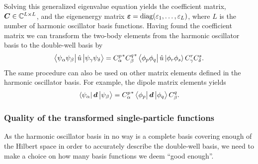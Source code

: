         Solving this generalized eigenvalue equation yields the coefficient
        matrix, $\boldsymbol{C} \in \mathbb{C}^{L\times L}$, and the eigenenergy matrix
        $\boldsymbol{\varepsilon} = \operatorname{diag}(\varepsilon_1, \dots, \varepsilon_L)$, where
        $L$ is the number of harmonic oscillator basis functions.
        Having found the coefficient matrix we can transform the two-body
        elements from the harmonic oscillator basis to the double-well basis by
        \begin{align}
            \bra{\psi_{\alpha} \psi_{\beta}}
            \hat{u}
            \ket{\psi_{\gamma} \psi_{\delta}}
            = {C^{p}_{\alpha}}^{*}
            {C^{q}_{\beta}}^{*}
            \bra{\phi_{p} \phi_{q}}
            \hat{u}
            \ket{\phi_{r} \phi_{s}}
            C^{r}_{\gamma}
            C^{s}_{\delta}.
        \end{align}
        The same procedure can also be used on other matrix elements defined in
        the harmonic oscillator basis. For example, the dipole matrix elements
        yields
        \begin{align}
            \bra{\psi_{\alpha}}
            \boldsymbol{d}
            \ket{\psi_{\beta}}
            = {C^{p}_{\alpha}}^{*}
            \bra{\phi_{p}}
            \boldsymbol{d}
            \ket{\phi_{q}}
            C^{q}_{\beta}.
        \end{align}

        \subsubsection{Quality of the transformed single-particle functions}
            As the harmonic oscillator basis in no way is a complete basis
            covering enough of the Hilbert space in order to accurately describe
            the double-well basis, we need to make a choice on how many basis
            functions we deem ``good enough''.
